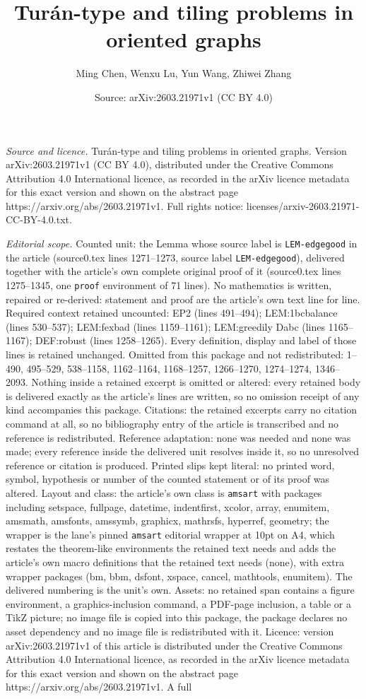 \documentclass[10pt,a4paper]{amsart}
\title[Tur\'an-type and tiling problems in oriented graphs]{Tur\'an-type and tiling problems in oriented graphs}
\author{Ming Chen, Wenxu Lu, Yun Wang, Zhiwei Zhang}
\date{Source: arXiv:2603.21971v1 (CC BY 4.0)}
\begin{document}
\maketitle

\noindent\emph{Source and licence.} Tur\'an-type and tiling problems in oriented graphs. Version arXiv:2603.21971v1 (CC BY 4.0), distributed under the Creative Commons Attribution 4.0 International licence, as recorded in the arXiv licence metadata for this exact version and shown on the abstract page https://arxiv.org/abs/2603.21971v1. Full rights notice: licenses/arxiv-2603.21971-CC-BY-4.0.txt.\par\smallskip

\noindent\textit{Editorial scope.} Counted unit: the Lemma whose source label is \texttt{LEM-edgegood} in the article (source0.tex lines 1271--1273, source label \texttt{LEM-edgegood}), delivered together with the article's own complete original proof of it (source0.tex lines 1275--1345, one \texttt{proof} environment of 71 lines). No mathematics is written, repaired or re-derived: statement and proof are the article's own text line for line. Required context retained uncounted: EP2 (lines 491--494); LEM:1bcbalance (lines 530--537); LEM:fexbad (lines 1159--1161); LEM:greedily Dabc (lines 1165--1167); DEF:robust (lines 1258--1265). Every definition, display and label of those lines is retained unchanged. Omitted from this package and not redistributed: 1--490, 495--529, 538--1158, 1162--1164, 1168--1257, 1266--1270, 1274--1274, 1346--2093. Nothing inside a retained excerpt is omitted or altered: every retained body is delivered exactly as the article's lines are written, so no omission receipt of any kind accompanies this package. Citations: the retained excerpts carry no citation command at all, so no bibliography entry of the article is transcribed and no reference is redistributed. Reference adaptation: none was needed and none was made; every reference inside the delivered unit resolves inside it, so no unresolved reference or citation is produced. Printed slips kept literal: no printed word, symbol, hypothesis or number of the counted statement or of its proof was altered. Layout and class: the article's own class is \texttt{amsart} with packages including setspace, fullpage, datetime, indentfirst, xcolor, array, enumitem, amsmath, amsfonts, amssymb, graphicx, mathrsfs, hyperref, geometry; the wrapper is the lane's pinned \texttt{amsart} editorial wrapper at 10pt on A4, which restates the theorem-like environments the retained text needs and adds the article's own macro definitions that the retained text needs (none), with extra wrapper packages (bm, bbm, dsfont, xspace, cancel, mathtools, enumitem). The delivered numbering is the unit's own. Assets: no retained span contains a figure environment, a graphics-inclusion command, a PDF-page inclusion, a table or a TikZ picture; no image file is copied into this package, the package declares no asset dependency and no image file is redistributed with it. Licence: version arXiv:2603.21971v1 of this article is distributed under the Creative Commons Attribution 4.0 International licence, as recorded in the arXiv licence metadata for this exact version and shown on the abstract page https://arxiv.org/abs/2603.21971v1. A full 
\end{document}
